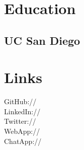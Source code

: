 \documentclass[]{deedy-resume-openfont}
\begin{document}
%
%
\lastupdated

%
%



%
%

\begin{minipage}[t]{0.33\textwidth} 


\section{Education} 

\subsection{UC San Diego}
\sectionsep


\section{Links} 
GitHub://\href{https://github.com/jonwho}{} \\
LinkedIn://\href{https://www.linkedin.com/in/jonwho}{} \\
Twitter://\href{https://twitter.com/lj080805}{} \\
WebApp://\href{https://cse134bteam3-hw5.firebaseapp.com/}{} \\
ChatApp://\href{https://playwithfire.firebaseapp.com/}{}
\sectionsep



\end{minipage}
\end{document}
